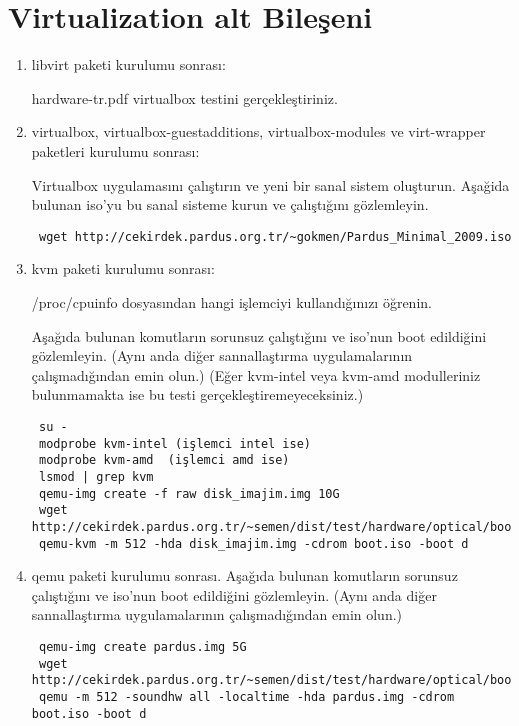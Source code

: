 \documentclass[a4paper,10pt]{article}
\begin{document}
\section{Virtualization alt Bileşeni}
\begin{enumerate}
 \item libvirt paketi kurulumu sonrası:

hardware-tr.pdf virtualbox testini gerçekleştiriniz.
 \item virtualbox, virtualbox-guestadditions, virtualbox-modules ve virt-wrapper paketleri kurulumu sonrası:
 
Virtualbox uygulamasını çalıştırın ve yeni bir sanal sistem oluşturun. Aşağida bulunan iso'yu bu sanal sisteme kurun ve çalıştığını gözlemleyin.
\begin{verbatim}
 wget http://cekirdek.pardus.org.tr/~gokmen/Pardus_Minimal_2009.iso
\end{verbatim}
 \item kvm paketi kurulumu sonrası:

/proc/cpuinfo dosyasından hangi işlemciyi kullandığınızı öğrenin.

Aşağıda bulunan komutların sorunsuz çalıştığını ve iso'nun boot edildiğini gözlemleyin. (Aynı anda diğer sannallaştırma uygulamalarının çalışmadığından emin olun.) (Eğer kvm-intel veya kvm-amd modulleriniz bulunmamakta ise bu testi gerçekleştiremeyeceksiniz.)

\begin{verbatim}
 su -
 modprobe kvm-intel (işlemci intel ise)
 modprobe kvm-amd  (işlemci amd ise)
 lsmod | grep kvm 
 qemu-img create -f raw disk_imajim.img 10G 
 wget http://cekirdek.pardus.org.tr/~semen/dist/test/hardware/optical/boot.iso
 qemu-kvm -m 512 -hda disk_imajim.img -cdrom boot.iso -boot d 
\end{verbatim}

\item qemu paketi kurulumu sonrası.
Aşağıda bulunan komutların sorunsuz çalıştığını ve iso'nun boot edildiğini gözlemleyin. (Aynı anda diğer sannallaştırma uygulamalarının çalışmadığından emin olun.)
\begin{verbatim}
 qemu-img create pardus.img 5G
 wget http://cekirdek.pardus.org.tr/~semen/dist/test/hardware/optical/boot.iso
 qemu -m 512 -soundhw all -localtime -hda pardus.img -cdrom boot.iso -boot d
\end{verbatim}


\end{enumerate}
\end{document}
